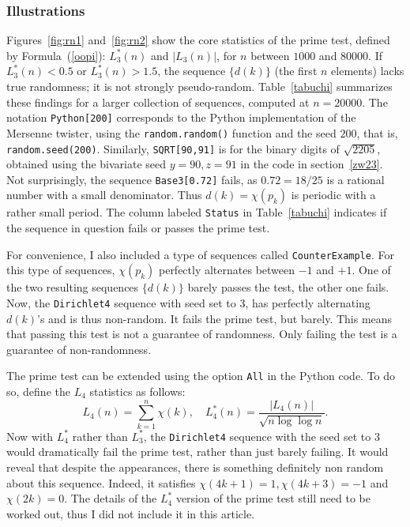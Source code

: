 \documentclass[oneside,10pt]{book}
\begin{document}
\subsubsection{Illustrations}

Figures~\ref{fig:rn1} and~\ref{fig:rn2} show the core statistics of the prime test,
 defined by Formula~(\ref{oopi}): $L^*_3(n)$ and $|L_3(n)|$, for $n$ between
 $\num{1000}$ and $\num{80000}$.  If $L^*_3(n)<0.5$ or $L^*_3(n)>1.5$, the sequence $\{d(k)\}$ (the first $n$ elements) lacks true randomness; it is not 
 \textcolor{index}{strongly pseudo-random}. Table~\ref{tabuchi} summarizes these findings for a larger collection of sequences, 
 computed at $n=\num{20000}$.
  The notation \texttt{Python[200]} corresponds to the Python implementation 
 of the Mersenne twister, using the \texttt{random.random()} function and the seed $200$, that is, \texttt{random.seed(200)}. 
 Similarly, \texttt{SQRT[90,91]} is for the binary digits of $\sqrt{2205}$, obtained using the bivariate seed $y=90, z=91$ in the code in section~\ref{zw23}. Not surprisingly, the sequence \texttt{Base3[0.72]} fails, as $0.72=18/25$ is a rational number with a small denominator. 
 Thus $d(k)=\chi(p_k)$ is periodic with a rather small period. The column labeled \texttt{Status} in Table~\ref{tabuchi} indicates if the sequence in question fails or passes the prime test.



For convenience, I also included a type of sequences called \texttt{CounterExample}. For this type of sequences, $\chi(p_k)$ perfectly alternates between $-1$ and $+1$. One of the two resulting sequences $\{d(k)\}$ barely passes the test, the other one fails.
Now, the \texttt{Dirichlet4} sequence with seed set to $3$, has perfectly alternating $d(k)$'s and is thus non-random.  It fails the prime test, but barely.
This  means that passing this test is not a guarantee of randomness. Only failing the test is a guarantee of non-randomness. 
 

The prime test can be extended using the option \texttt{All} in the Python code. To do so, define the $L_4$ statistics as follows:
\begin{equation}
L_4(n)=\sum_{k=1}^n \chi(k), \quad L^*_4(n)=\frac{|L_4(n)|}{\sqrt{n\log\log n}}.\label{l4}
\end{equation}
Now with $L^*_4$ rather than $L^*_3$, the \texttt{Dirichlet4} sequence with the seed set to $3$ would dramatically fail the prime test,
 rather than just barely failing. It would reveal that despite the appearances, there is something definitely non random about this sequence. Indeed, it satisfies 
$\chi(4k+1)=1, \chi(4k+3)=-1$ and $\chi(2k)=0$.  The details of the $L^*_4$ version of the prime test still need to be worked out, thus I did not include it in this article. 
\end{document}
